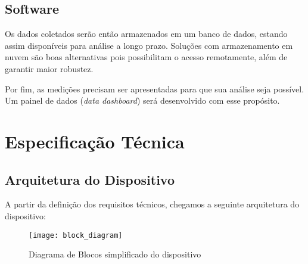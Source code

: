 \documentclass[../monografia.tex]{subfiles}
\begin{document}
\subsection{Software}

Os dados coletados serão então armazenados em um banco de dados, estando assim disponíveis para análise a longo prazo. Soluções com armazenamento em nuvem são boas alternativas pois possibilitam o acesso remotamente, além de garantir maior robustez.

Por fim, as medições precisam ser apresentadas para que sua análise seja possível. Um painel de dados (\textit{data dashboard}) será desenvolvido com esse propósito. 


\section{Especificação Técnica}%

\subsection{Arquitetura do Dispositivo} 
A partir da definição dos requisitos técnicos, chegamos a seguinte arquitetura do dispositivo:

\begin{figure}[h]
    \centering
    \texttt{[image: block\_diagram]}
    \caption{Diagrama de Blocos simplificado do dispositivo}
    \label{fig:Diagrama de Blocos}
\end{figure}
\end{document}
